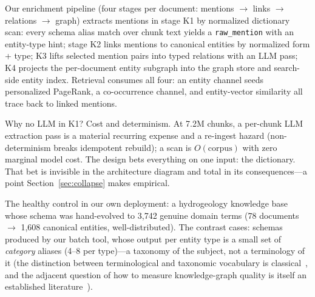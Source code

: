 \documentclass[preprint,12pt]{elsarticle}
\begin{document}
Our enrichment pipeline (four stages per document: mentions $\to$ links
$\to$ relations $\to$ graph) extracts mentions in stage K1 by normalized
dictionary scan: every schema alias match over chunk text yields a
\texttt{raw\_mention} with an entity-type hint; stage K2 links mentions to
canonical entities by normalized form + type; K3 lifts selected mention
pairs into typed relations with an LLM pass; K4 projects the per-document
entity subgraph into the graph store and search-side entity index.
Retrieval consumes all four: an entity channel seeds personalized PageRank,
a co-occurrence channel, and entity-vector similarity all trace back to
linked mentions.

Why no LLM in K1? Cost and determinism. At 7.2M chunks, a per-chunk LLM
extraction pass is a material recurring expense and a re-ingest hazard
(non-determinism breaks idempotent rebuild); a scan is $O(\mathrm{corpus})$
with zero marginal model cost. The design bets everything on one input: the
dictionary. That bet is invisible in the architecture diagram and total in
its consequences---a point Section~\ref{sec:collapse} makes empirical.

The healthy control in our own deployment: a hydrogeology knowledge base
whose schema was hand-evolved to 3{,}742 genuine domain terms (78 documents
$\to$ 1{,}608 canonical entities, well-distributed). The contrast cases:
schemas produced by our batch tool, whose output per entity type is a small
set of \emph{category} aliases (4--8 per type)---a taxonomy of the subject,
not a terminology of it (the distinction between terminological and
taxonomic vocabulary is classical~\cite{iso1087}, and the adjacent question
of how to measure knowledge-graph quality is itself an established
literature~\cite{paulheim}).
\end{document}
